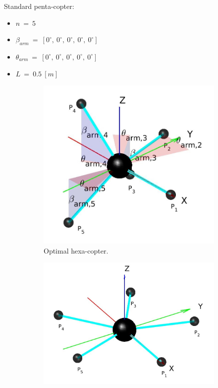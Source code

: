 Standard penta-copter:
\begin{itemize}
  \item $n\ =\ 5$
  \item $\beta_{arm}\ =\ [0^{\circ},\  0^{\circ},\  0^{\circ},\  0^{\circ},\  0^{\circ}]$
  \item $\theta_{arm}\ =\ [0^{\circ},\  0^{\circ},\  0^{\circ},\  0^{\circ},\  0^{\circ}]$
  \item $L\ =\ 0.5\ [m]$
\end{itemize}
\begin{figure}[!h]
  \begin{subfigure}[b]{0.4\textwidth}
    \includegraphics[width=\linewidth]{images/Pentacopter_odd.jpg}
    \caption{Optimal hexa-copter.} \label{fig:Pentacopter_odd}
  \end{subfigure}
  \hspace*{\fill} %
  \begin{subfigure}[b]{0.5\textwidth}
    \includegraphics[width=\linewidth]{images/Pentacopter_standard.jpg}

\end{subfigure}
\end{figure}
